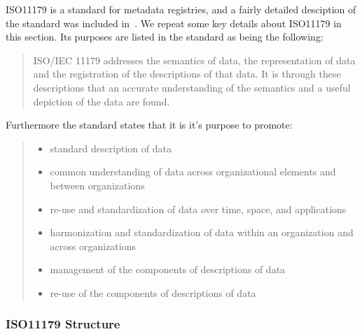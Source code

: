 \documentclass[runningheads]{llncs}
\begin{document}
	ISO11179 is a standard for metadata registries, and a fairly detailed desciption of the standard was included in~\cite{modelsward19}. We repeat some key details about ISO11179 in this section.  Its purposes are listed in the standard as being the following:
		\begin{quote}
		ISO/IEC 11179 addresses the semantics of data, the representation of data and the registration of the descriptions of that data. It is through these descriptions that an accurate understanding of the semantics and a useful depiction of the data are found. 
	\end{quote} 
 	Furthermore the standard states that it is it's purpose to promote:
	\begin{quote}
		\begin{itemize}
			\item standard description of data
			\item common understanding of data across organizational elements and between organizations
			\item re-use and standardization of data over time, space, and applications
			\item harmonization and standardization of data within an organization and across organizations
			\item management of the components of descriptions of data
			\item re-use of the components of descriptions of data
	    \end{itemize}
    \end{quote} 	



\subsubsection{ISO11179 Structure}
\end{document}
